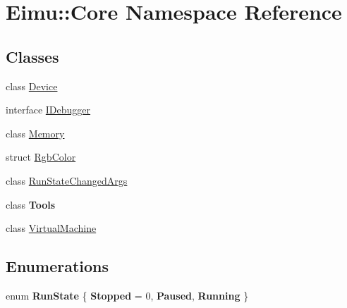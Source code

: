 \hypertarget{namespace_eimu_1_1_core}{
\section{Eimu::Core Namespace Reference}
\label{namespace_eimu_1_1_core}
}
\subsection*{Classes}
\begin{DoxyCompactItemize}
\item 
class \hyperlink{class_eimu_1_1_core_1_1_device}{Device}
\item 
interface \hyperlink{interface_eimu_1_1_core_1_1_i_debugger}{IDebugger}
\item 
class \hyperlink{class_eimu_1_1_core_1_1_memory}{Memory}
\item 
struct \hyperlink{struct_eimu_1_1_core_1_1_rgb_color}{RgbColor}
\item 
class \hyperlink{class_eimu_1_1_core_1_1_run_state_changed_args}{RunStateChangedArgs}
\item 
class {\bfseries Tools}
\item 
class \hyperlink{class_eimu_1_1_core_1_1_virtual_machine}{VirtualMachine}
\end{DoxyCompactItemize}
\subsection*{Enumerations}
\begin{DoxyCompactItemize}
\item 
enum {\bfseries RunState} \{ {\bfseries Stopped} =  0, 
{\bfseries Paused}, 
{\bfseries Running}
 \}
\end{DoxyCompactItemize}
